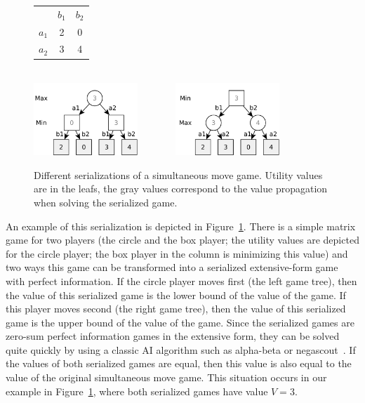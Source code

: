 \begin{figure}
\centering
\begin{tabular}{l|c|c|}
 \multicolumn{1}{c}{~} & \multicolumn{1}{c}{$b_1$}  &  \multicolumn{1}{c}{$b_2$}\\\cline{2-3}
$a_1$ &  2  &  0\\\cline{2-3}
$a_2$ &  3  &  4\\\cline{2-3}
\end{tabular}
\\\vspace{0.5cm}
\includegraphics[width=0.35\textwidth]{figures/serialization1.pdf}~~~~~~~
\includegraphics[width=0.35\textwidth]{figures/serialization2.pdf}
\caption{Different serializations of a simultaneous move game. Utility values are in the leafs, the gray values correspond to the value propagation when solving the serialized game.}\label{fig:serialization}
\end{figure}

An example of this serialization is depicted in Figure~\ref{fig:serialization}.
There is a simple matrix game for two players (the circle and the box player; the utility values are depicted for the circle player; the box player in the column is minimizing this value) and two ways this game can be transformed into a serialized extensive-form game with perfect information.
If the circle player moves first (the left game tree), then the value of this serialized game is the lower bound of the value of the game. If this player moves second (the right game tree), then the value of this serialized game is the upper bound of the value of the game.
Since the serialized games are zero-sum perfect information games in the extensive form, they can be solved quite quickly by using a classic AI
algorithm such as alpha-beta or negascout~\cite{Negascout}.
If the values of both serialized games are equal, then this value is also equal to the value of the original simultaneous move game.
This situation occurs in our example in Figure~\ref{fig:serialization}, where both serialized games have value $V = 3$.

